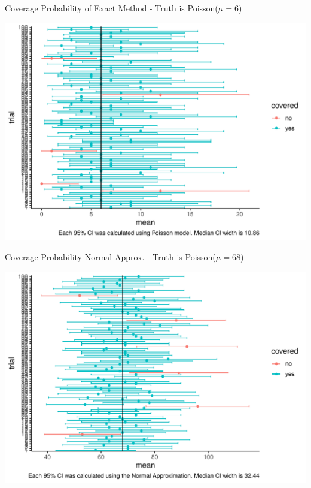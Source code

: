 \documentclass[10pt]{beamer}\usepackage[]{graphicx}\usepackage[]{color}
\makeatletter
\def\maxwidth{ %
  \ifdim\Gin@nat@width>\linewidth
    \linewidth
  \else
    \Gin@nat@width
  \fi
}
\newenvironment{knitrout}{}{} %
\makeatother
\begin{document}
\begin{frame}[fragile]{Coverage Probability of Exact Method - Truth is Poisson($\mu=6$)}
	
\begin{knitrout}\tiny
{}\color{fgcolor}

{\centering \includegraphics[width=\maxwidth]{figure/unnamed-chunk-5-1} 

}



\end{knitrout}
	
\end{frame}



\begin{frame}[fragile]{Coverage Probability Normal Approx. - Truth is Poisson($\mu=68$)}
	
\begin{knitrout}\tiny
{}\color{fgcolor}

{\centering \includegraphics[width=\maxwidth]{figure/unnamed-chunk-6-1} 

}



\end{knitrout}
	
\end{frame}
\end{document}
